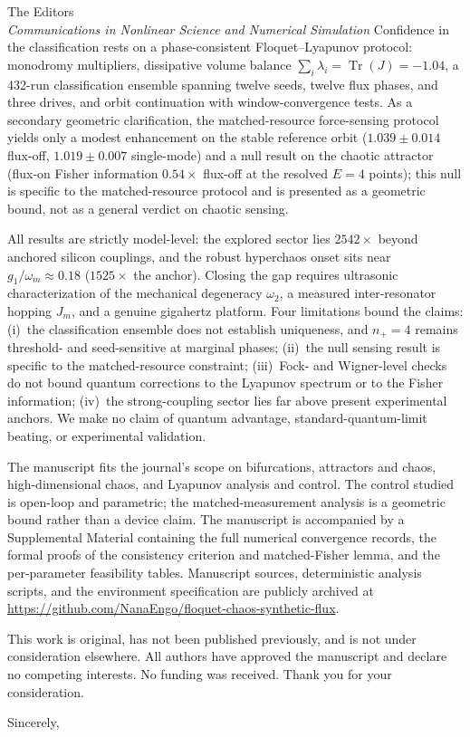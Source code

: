 \documentclass[11pt,a4paper]{letter}
\begin{document}
\begin{letter}{The Editors\\\textit{Communications in Nonlinear Science and Numerical Simulation}}
Confidence in the classification rests on a phase-consistent Floquet--Lyapunov protocol: monodromy multipliers, dissipative volume balance $\sum_i\lambda_i=\operatorname{Tr}(J)=-1.04$, a \num{432}-run classification ensemble spanning twelve seeds, twelve flux phases, and three drives, and orbit continuation with window-convergence tests. As a secondary geometric clarification, the matched-resource force-sensing protocol yields only a modest enhancement on the stable reference orbit ($\num{1.039}\pm\num{0.014}$ flux-off, $\num{1.019}\pm\num{0.007}$ single-mode) and a null result on the chaotic attractor (flux-on Fisher information $\num{0.54}\times$ flux-off at the resolved $E=\num{4}$ points); this null is specific to the matched-resource protocol and is presented as a geometric bound, not as a general verdict on chaotic sensing.

All results are strictly model-level: the explored sector lies $\num{2542}\times$ beyond anchored silicon couplings, and the robust hyperchaos onset sits near $g_1/\omega_m\approx\num{0.18}$ ($\num{1525}\times$ the anchor). Closing the gap requires ultrasonic characterization of the mechanical degeneracy $\omega_2$, a measured inter-resonator hopping $J_m$, and a genuine gigahertz platform. Four limitations bound the claims: (i)~the classification ensemble does not establish uniqueness, and $n_+=4$ remains threshold- and seed-sensitive at marginal phases; (ii)~the null sensing result is specific to the matched-resource constraint; (iii)~Fock- and Wigner-level checks do not bound quantum corrections to the Lyapunov spectrum or to the Fisher information; (iv)~the strong-coupling sector lies far above present experimental anchors. We make no claim of quantum advantage, standard-quantum-limit beating, or experimental validation.

The manuscript fits the journal's scope on bifurcations, attractors and chaos, high-dimensional chaos, and Lyapunov analysis and control. The control studied is open-loop and parametric; the matched-measurement analysis is a geometric bound rather than a device claim. The manuscript is accompanied by a Supplemental Material containing the full numerical convergence records, the formal proofs of the consistency criterion and matched-Fisher lemma, and the per-parameter feasibility tables. Manuscript sources, deterministic analysis scripts, and the environment specification are publicly archived at \url{https://github.com/NanaEngo/floquet-chaos-synthetic-flux}.

This work is original, has not been published previously, and is not under consideration elsewhere. All authors have approved the manuscript and declare no competing interests. No funding was received. Thank you for your consideration.

\closing{Sincerely,}
\end{letter}
\end{document}
